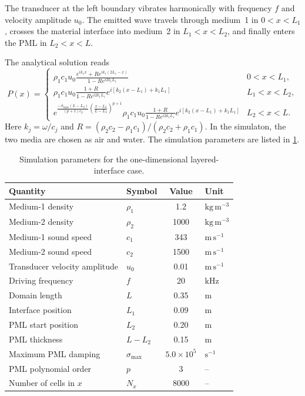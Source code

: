\documentclass[final,num,12pt]{elsarticle}
\begin{document}
The transducer at the left boundary vibrates harmonically with frequency $f$
and velocity amplitude $u_0$.   The emitted wave
travels through medium~1 in $0<x<L_1$, crosses the material interface into
medium~2 in $L_1<x<L_2$, and finally enters the PML in $L_2<x<L$.

The analytical solution reads
\begin{equation}
    P(x) = 
    \begin{cases}
        \rho_1c_1u_0\frac{e^{ik_1x}+Re^{ik_1(2L_1-x)}}{1-Re^{i2k_1L_1}} & 0<x<L_1, \\[1ex]
        \rho_1c_1u_0\frac{1+R}{1-Re^{i2k_1L_1}}e^{i\left[k_2(x-L_1)+k_1L_1\right]} & L_1<x<L_2, \\[1ex]
        e^{\frac{-\sigma_{\max}(L-L_2)}{(p+1)c_2}\left(\frac{x-L_2}{L-L_2}\right)^{p+1}}
        \rho_1c_1u_0\frac{1+R}{1-Re^{i2k_1L_1}}e^{i\left[k_2(x-L_1)+k_1L_1\right]} & L_2<x<L .
    \end{cases}
\end{equation}
Here $k_j=\omega/c_j$ and
$R=(\rho_2c_2-\rho_1c_1)/(\rho_2c_2+\rho_1c_1)$.  In the simulaton, the two media are chosen as air and water.  The simulation parameters
are listed in \cref{tab:params1DTwoPhase}.
\begin{table}[H]
    \centering
    \caption{Simulation parameters for the one-dimensional layered-interface case.}
    \label{tab:params1DTwoPhase}
    \begin{tabular}{llcl}
        \toprule
        Quantity & Symbol & Value & Unit \\
        \midrule
        Medium-1 density & $\rho_1$ & 1.2 & $\mathrm{kg\,m^{-3}}$ \\
        Medium-2 density & $\rho_2$ & 1000 & $\mathrm{kg\,m^{-3}}$ \\
        Medium-1 sound speed & $c_1$ & 343 & $\mathrm{m\,s^{-1}}$ \\
        Medium-2 sound speed & $c_2$ & 1500 & $\mathrm{m\,s^{-1}}$ \\
        Transducer velocity amplitude & $u_0$ & 0.01 & $\mathrm{m\,s^{-1}}$ \\
        Driving frequency & $f$ & 20 & $\mathrm{kHz}$ \\
        Domain length & $L$ & 0.35 & $\mathrm{m}$ \\
        Interface position & $L_1$ & 0.09 & $\mathrm{m}$ \\
        PML start position & $L_2$ & 0.20 & $\mathrm{m}$ \\
        PML thickness & $L-L_2$ & 0.15 & $\mathrm{m}$ \\
        Maximum PML damping & $\sigma_{\max}$ & $5.0\times10^5$ & $\mathrm{s^{-1}}$ \\
        PML polynomial order & $p$ & 3 & -- \\
        Number of cells in $x$ & $N_x$ & 8000 & -- \\
        \bottomrule
    \end{tabular}
\end{table}
\end{document}
